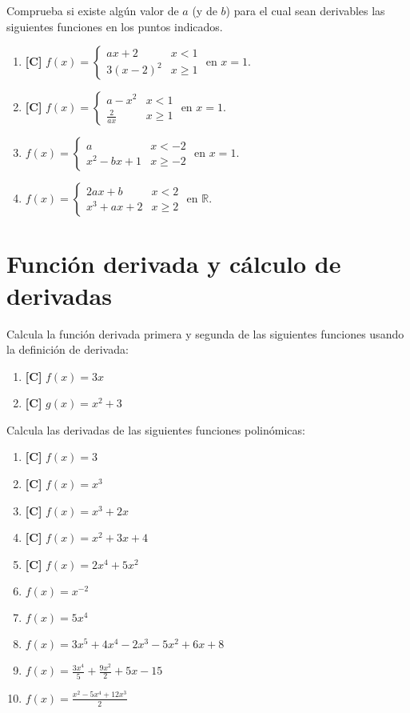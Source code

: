\Exercicio Comprueba si existe algún valor de $a$ (y de $b$) para el cual sean derivables las siguientes funciones en los puntos indicados.
\begin{enumerate}[topsep=0pt]
	\item \textbf{[C]} $ f(x) = \left\{ \begin{array}{lc}
						 ax+2 & x < 1 \\
						 3(x-2)^2  & x \ge 1
						 \end{array}
	 					\right.$
	 					en $x=1$.
	\item \textbf{[C]} $ f(x) = \left\{ \begin{array}{lc}
						 a-x^2 & x < 1 \\
						 \frac{2}{ax}  & x \ge 1
						 \end{array}
	 					\right.$
	 					en $x=1$.
	 \item $ f(x) = \left\{ \begin{array}{lc}
		 	a & x < -2 \\
		 	x^2-bx+1  & x \ge -2
			\end{array}
			\right.$
		 	en $x=1$.
	 \item $ f(x) = \left\{ \begin{array}{lc}
			2ax +b & x < 2 \\
			x^3+ax+2  & x \ge 2
			\end{array}
			\right.$
			en $\mathbb{R}$.

\end{enumerate}


\section{Función derivada y cálculo de derivadas}

\Exercicio Calcula la función derivada primera y segunda de las siguientes funciones usando la definición de derivada:
\begin{enumerate}[topsep=0pt]
	\item \textbf{[C]} $f(x) = 3x$
	\item \textbf{[C]} $g(x) = x^2 + 3$
\end{enumerate}


\Exercicio Calcula las derivadas de las siguientes funciones polinómicas:

\begin{enumerate}[topsep=0pt]
	\item \textbf{[C]} $ f(x) = 3$
	\item \textbf{[C]} $ f(x) = x^3 $
	\item \textbf{[C]} $ f(x) = x^3 + 2x $
	\item \textbf{[C]} $ f(x) = x^2 + 3x + 4 $
	\item \textbf{[C]} $ f(x) = 2x^4 + 5x^2 $
	\item $ f(x) =  x^{-2}$
	\item $ f(x) =  5x^4$
	\item $ f(x) =  3x^5 +4x^4 -2x^3 -5x^2 +6x +8$
	\item $ f(x) =  \frac{3x^4}{5} + \frac{9x^2}{2} + 5x -15$
	\item $ f(x) =  \frac{x^2-5x^4+12x^3}{2}$
\end{enumerate}


